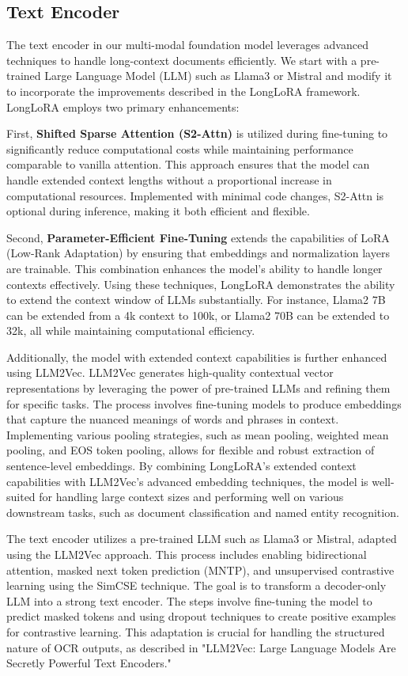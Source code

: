 \documentclass{article}
\begin{document}
\subsection{Text Encoder}

The text encoder in our multi-modal foundation model leverages advanced techniques to handle long-context documents efficiently. We start with a pre-trained Large Language Model (LLM) such as Llama3 or Mistral and modify it to incorporate the improvements described in the LongLoRA framework. LongLoRA employs two primary enhancements:

First, \textbf{Shifted Sparse Attention (S2-Attn)} is utilized during fine-tuning to significantly reduce computational costs while maintaining performance comparable to vanilla attention. This approach ensures that the model can handle extended context lengths without a proportional increase in computational resources. Implemented with minimal code changes, S2-Attn is optional during inference, making it both efficient and flexible.

Second, \textbf{Parameter-Efficient Fine-Tuning} extends the capabilities of LoRA (Low-Rank Adaptation) by ensuring that embeddings and normalization layers are trainable. This combination enhances the model's ability to handle longer contexts effectively. Using these techniques, LongLoRA demonstrates the ability to extend the context window of LLMs substantially. For instance, Llama2 7B can be extended from a 4k context to 100k, or Llama2 70B can be extended to 32k, all while maintaining computational efficiency.

Additionally, the model with extended context capabilities is further enhanced using LLM2Vec. LLM2Vec generates high-quality contextual vector representations by leveraging the power of pre-trained LLMs and refining them for specific tasks. The process involves fine-tuning models to produce embeddings that capture the nuanced meanings of words and phrases in context. Implementing various pooling strategies, such as mean pooling, weighted mean pooling, and EOS token pooling, allows for flexible and robust extraction of sentence-level embeddings. By combining LongLoRA's extended context capabilities with LLM2Vec's advanced embedding techniques, the model is well-suited for handling large context sizes and performing well on various downstream tasks, such as document classification and named entity recognition.

The text encoder utilizes a pre-trained LLM such as Llama3 or Mistral, adapted using the LLM2Vec approach. This process includes enabling bidirectional attention, masked next token prediction (MNTP), and unsupervised contrastive learning using the SimCSE technique. The goal is to transform a decoder-only LLM into a strong text encoder. The steps involve fine-tuning the model to predict masked tokens and using dropout techniques to create positive examples for contrastive learning. This adaptation is crucial for handling the structured nature of OCR outputs, as described in "LLM2Vec: Large Language Models Are Secretly Powerful Text Encoders."
\end{document}
